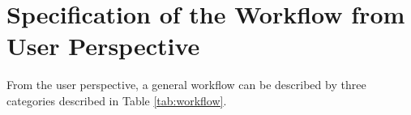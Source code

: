 \documentclass[a4paper]{article}
\begin{document}

\section{Specification of the Workflow from User Perspective}

From the user perspective, a general workflow can be described by three categories described in Table \ref{tab:workflow}.
\end{document}
